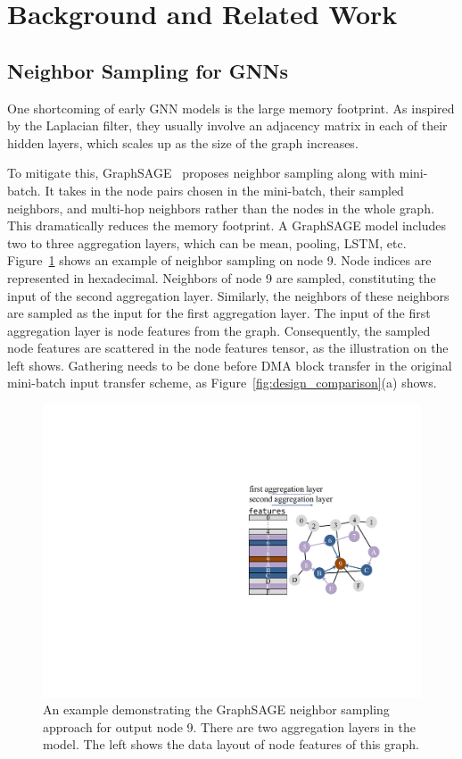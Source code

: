 \section{Background and Related Work}
\subsection{Neighbor Sampling for GNNs}
One shortcoming of early GNN models is the large memory footprint.
As inspired by the Laplacian filter, they usually involve an adjacency matrix in each of their hidden layers, which scales up as the size of the graph increases.




To mitigate this, GraphSAGE~\cite{hamilton2017inductive} proposes neighbor sampling along with mini-batch.
It takes in the node pairs chosen in the mini-batch, their sampled neighbors, and multi-hop neighbors rather than the nodes in the whole graph.
This dramatically reduces the memory footprint.
A GraphSAGE model includes two to three aggregation layers, which can be mean, pooling, LSTM, etc.
Figure~\ref{fig:GrpahSAGE} shows an example of neighbor sampling on node 9.
Node indices are represented in hexadecimal.
Neighbors of node 9 are sampled, constituting the input of the second aggregation layer.
Similarly, the neighbors of these neighbors are sampled as the input for the first aggregation layer.
The input of the first aggregation layer is node features from the graph.
Consequently, the sampled node features are scattered in the node features tensor, as the illustration on the left shows.
Gathering needs to be done before DMA block transfer in the original mini-batch input transfer scheme, as Figure~\ref{fig:design_comparison}(a) shows.



\begin{figure}[!htbp]
    \centering
    \includegraphics[width=0.5\linewidth]{figures/PyTorchDirect/GraphSAGE2_recolored.pdf}
    \caption{An example demonstrating the GraphSAGE neighbor sampling approach for output node 9. There are two aggregation layers in the model. The left shows the data layout of node features of this graph.}\label{fig:GrpahSAGE}
\end{figure}

